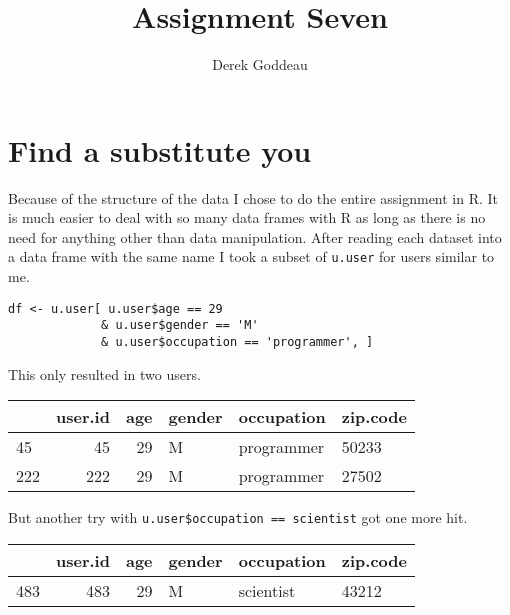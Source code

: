\documentclass[12pt, a4paper]{article}
\author{Derek Goddeau}
\title{Assignment Seven}
\newcommand{\code}[1]{\texttt{#1}}
\begin{document}
\maketitle

\newpage



\section{Find a substitute you}

Because of the structure of the data I chose to do the entire assignment in R. It is much easier to deal with so many data frames with R as long as there is no need for anything other than data manipulation. After reading each dataset into a data frame with the same name I took a subset of \code{u.user} for users similar to me.

\begin{minipage}{\linewidth} %
\vspace{4em}
\begin{verbatim}
df <- u.user[ u.user$age == 29
             & u.user$gender == 'M'
             & u.user$occupation == 'programmer', ]
\end{verbatim}
\vspace{4em}
\end{minipage}

\noindent
This only resulted in two users.

\begin{minipage}{\linewidth} %
\vspace{4em}
\centering
\begin{tabular}{|l|r|r|l|l|l|}
    \hline
      & user.id & age & gender & occupation & zip.code\\
    \hline
    45 & 45 & 29 & M & programmer & 50233\\
    \hline
    222 & 222 & 29 & M & programmer & 27502\\
    \hline
\end{tabular}
\vspace{4em}
\end{minipage}

\noindent
But another try with \code{u.user\$occupation == \textquotesingle scientist\textquotesingle} got one more hit.

\begin{minipage}{\linewidth} %
\vspace{4em}
\centering
\begin{tabular}{|l|r|r|l|l|l|}
    \hline
      & user.id & age & gender & occupation & zip.code\\
    \hline
    483 & 483 & 29 & M & scientist & 43212\\
    \hline
\end{tabular}
\vspace{4em}
\end{minipage}
\end{document}
